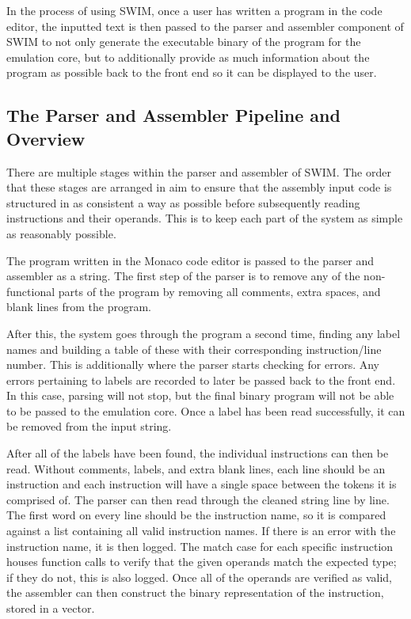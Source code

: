 \documentclass[
    paper=letter,
    parskip=half,
    fontsize=12pt,
    titlepage=firstiscover,
    toc=bibliography,
    numbers=endperiod
]{scrartcl}
\begin{document}
In the process of using SWIM, once a user has written a program in the
code editor, the inputted text is then passed to the parser and
assembler component of SWIM to not only generate the executable binary
of the program for the emulation core, but to additionally provide as
much information about the program as possible back to the front end so
it can be displayed to the user.

\subsection{The Parser and Assembler Pipeline and Overview}

There are multiple stages within the parser and assembler of SWIM. The
order that these stages are arranged in aim to ensure that the assembly
input code is structured in as consistent a way as possible before
subsequently reading instructions and their operands. This is to keep
each part of the system as simple as reasonably possible.

The program written in the Monaco code editor is passed to the parser
and assembler as a string. The first step of the parser is to remove any
of the non-functional parts of the program by removing all comments,
extra spaces, and blank lines from the program.

After this, the system goes through the program a second time, finding
any label names and building a table of these with their corresponding
instruction/line number. This is additionally where the parser starts
checking for errors. Any errors pertaining to labels are recorded to
later be passed back to the front end. In this case, parsing will not
stop, but the final binary program will not be able to be passed to the
emulation core. Once a label has been read successfully, it can be
removed from the input string.

After all of the labels have been found, the individual instructions can
then be read. Without comments, labels, and extra blank lines, each line
should be an instruction and each instruction will have a single space
between the tokens it is comprised of. The parser can then read through
the cleaned string line by line. The first word on every line should be
the instruction name, so it is compared against a list containing all
valid instruction names. If there is an error with the instruction name,
it is then logged. The match case for each specific instruction houses
function calls to verify that the given operands match the expected
type; if they do not, this is also logged. Once all of the operands are
verified as valid, the assembler can then construct the binary
representation of the instruction, stored in a vector.
\end{document}
